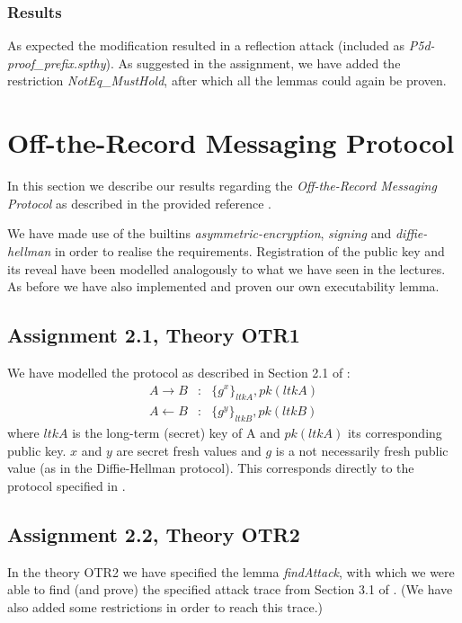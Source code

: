 \documentclass[a4paper]{article}
\begin{document}
\subsubsection*{Results}
As expected the modification resulted in a reflection attack (included as {\em P5d-proof\_prefix.spthy}). As suggested in the assignment, we have added the restriction {\em NotEq\_MustHold}, after which all the lemmas could again be proven.


\section{Off-the-Record Messaging Protocol}
In this section we describe our results regarding the {\em Off-the-Record Messaging Protocol} as described in the provided reference \cite{1}. \par
We have made use of the builtins {\em asymmetric-encryption}, {\em signing} and {\em diffie-hellman} in order to realise the requirements. Registration of the public key and its reveal have been modelled analogously to what we have seen in the lectures. As before we have also implemented and proven our own executability lemma.

\subsection{Assignment 2.1, Theory OTR1}
We have modelled the protocol as described in Section 2.1 of \cite{1}:
\begin{eqnarray*}
A \to B            & : & \{{g^x}\}_{ltkA}, {pk(ltkA)}\\
A \leftarrow B & : & \{{g^y}\}_{ltkB}, {pk(ltkB)}
\end{eqnarray*}
where $ltkA$ is the long-term (secret) key of A and $pk(ltkA)$ its corresponding public key. $x$ and $y$ are secret fresh values and $g$ is a not necessarily fresh public value (as in the Diffie-Hellman protocol). This corresponds directly to the protocol specified in \cite{1}.

\subsection{Assignment 2.2, Theory OTR2}
In the theory {OTR2} we have specified the lemma {\em findAttack}, with which we were able to find (and prove) the specified attack trace from Section 3.1 of \cite{1}. (We have also added some restrictions in order to reach this trace.) \par \noindent
\end{document}
